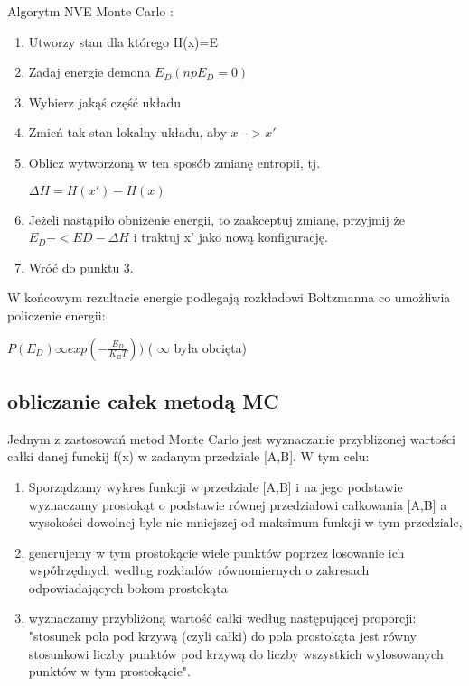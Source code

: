 \documentclass{article}
\begin{document}
		Algorytm NVE Monte Carlo :\newline
		\begin{enumerate}
			\item Utworzy stan dla którego H(x)=E
			\item Zadaj energie demona $E_{D}(np E_{D}=0)$
			\item Wybierz jakąś część układu
			\item Zmień tak stan lokalny układu, aby $x->x'$
			\item Oblicz wytworzoną w ten sposób zmianę entropii, tj.\newline
			\begin{center}	$\Delta H=H(x')-H(x)$ \end{center}
			\item Jeżeli nastąpiło obniżenie energii, to zaakceptuj zmianę, przyjmij że $E_{D}-< E{D}-\Delta H $ i traktuj x' jako nową konfigurację.
			\item Wróć do punktu 3.
		\end{enumerate}
		W końcowym rezultacie energie podlegają rozkładowi Boltzmanna co umożliwia policzenie energii:
		\begin{center}
			$P(E_{D})\infty exp(-\frac{E_{D}}{K_{B}T}))$ ( $\infty$ była obcięta)
		\end{center}
		\subsection{obliczanie całek metodą MC}
		Jednym z zastosowań metod Monte Carlo jest wyznaczanie przybliżonej wartości całki danej funckij f(x) w zadanym przedziale [A,B]. W tym celu:\newline
		\begin{enumerate}
			\item Sporządzamy wykres funkcji w przedziale [A,B] i na jego podstawie wyznaczamy prostokąt o podstawie równej przedziałowi całkowania [A,B] a wysokości dowolnej byle nie mniejszej od maksimum funkcji w tym przedziale,
			\item generujemy w tym prostokącie wiele punktów poprzez losowanie ich współrzędnych według rozkładów równomiernych o zakresach odpowiadających bokom prostokąta 
			\item wyznaczamy przybliżoną wartość całki według następującej proporcji:
			"stosunek pola pod krzywą (czyli całki) do pola prostokąta jest równy stosunkowi liczby punktów pod krzywą do liczby wszystkich wylosowanych punktów w tym prostokącie". 
		\end{enumerate}
\end{document}
